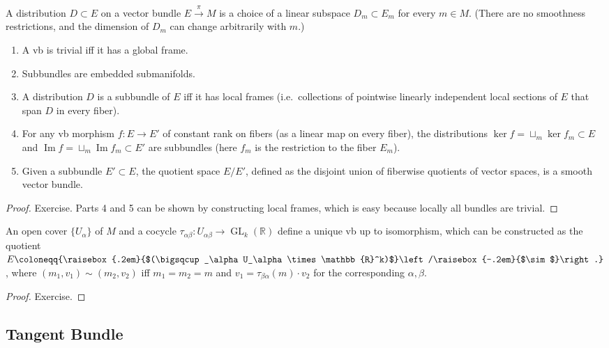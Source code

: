 \documentclass[english,letterpaper]{article}%
\numberwithin{equation}{section}
\numberwithin{figure}{section}
\numberwithin{table}{section}
\theoremstyle{definition}
\theoremstyle{definition}
\theoremstyle{definition}
\theoremstyle{plain}
\theoremstyle{plain}
\theoremstyle{plain}
\theoremstyle{plain}
\theoremstyle{remark}
\theoremstyle{remark}
\renewcommand{\Im}{\operatorname{Im}}
\DeclareMathOperator{\GL}{GL}
\newcommand{\bigslant}[2]{{\raisebox{.2em}{$#1$}\left/\raisebox{-.2em}{$#2$}\right.}}
\begin{document}
\begin{defn}[Distribution]
A distribution $D\subset E$ on a vector bundle $E\overset{\pi}{\to}M$ is a choice of a linear subspace $D_m\subset E_m$ for every $m\in M$. (There are no smoothness restrictions, and the dimension of $D_m$ can change arbitrarily with $m$.)
\end{defn}
\begin{thm}\label{subbundles thm}
\begin{enumerate}
    \item A \gls{vb} is trivial iff it has a global frame.
    \item Subbundles are embedded submanifolds.
    \item A distribution $D$ is a subbundle of $E$ iff it has local frames (i.e.\ collections of pointwise linearly independent local sections of $E$ that span $D$ in every fiber).
    \item For any \gls{vb} morphism $f:E\to E'$ of constant rank on fibers (as a linear map on every fiber), the distributions $\ker f=\sqcup_m \ker f_m\subset E$ and $\Im f=\sqcup_m \Im f_m\subset E'$ are subbundles (here $f_m$ is the restriction to the fiber $E_m$).
    \item Given a subbundle $E'\subset E$,  the quotient space $E/E'$, defined as the disjoint union of fiberwise quotients of vector spaces, is a smooth vector bundle.
\end{enumerate}
\end{thm}
\begin{proof}
Exercise. 
Parts 4 and 5 can be shown by constructing local frames, which is easy because locally all bundles are trivial.
\end{proof}

\begin{prop}
An open cover $\{U_\alpha\}$ of $M$ and a cocycle $\tau_{\alpha\beta}:U_{\alpha\beta}\to\GL_k (\mathbb{R})$ define a unique \gls{vb} up to isomorphism, which can be constructed as the quotient $E\coloneqq \bigslant{(\bigsqcup_\alpha U_\alpha \times \mathbb{R}^k)}{\sim}$, where $(m_1,v_1)\sim(m_2,v_2)$ iff $m_1=m_2=m$ and $v_1=\tau_{\beta\alpha}(m)\cdot v_2$ for the corresponding $\alpha,\beta$.
\end{prop}
\begin{proof}
Exercise.
\end{proof}


\subsection{Tangent Bundle}
\end{document}
